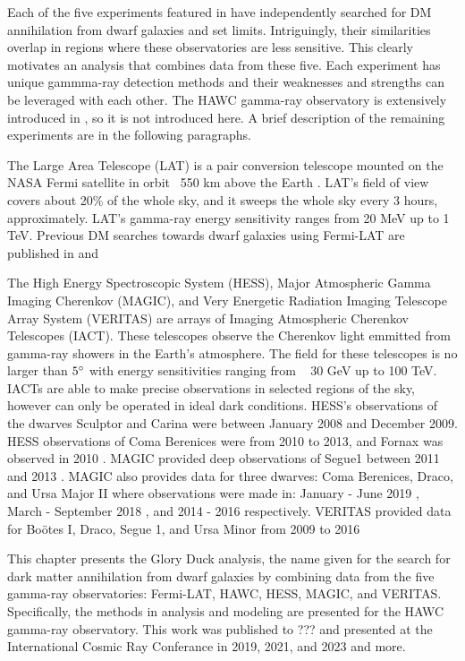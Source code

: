 Each of the five experiments featured in  have independently searched for DM annihilation from dwarf galaxies and set limits.
Intriguingly, their similarities overlap in regions where these observatories are less sensitive.
This clearly motivates an analysis that combines data from these five.
Each experiment has unique gammma-ray detection methods and their weaknesses and strengths can be leveraged with each other.
The HAWC gamma-ray observatory is extensively introduced in , so it is not introduced here.
A brief description of the remaining experiments are in the following paragraphs.

The Large Area Telescope (LAT) is a pair conversion telescope mounted on the NASA Fermi satellite in orbit ~550 km above the Earth \cite{FermiLAT}.
LAT's field of view covers about 20\% of the whole sky, and it sweeps the whole sky every 3 hours, approximately.
LAT's gamma-ray energy sensitivity ranges from 20 MeV up to 1 TeV.
Previous DM searches towards dwarf galaxies using Fermi-LAT are published in \cite{FermiLAT:dm1} and \cite{FermiLAT:dm2}

\sloppy The High Energy Spectroscopic System (HESS), Major Atmospheric Gamma Imaging
Cherenkov (MAGIC), and Very Energetic Radiation Imaging Telescope Array System (VERITAS) are arrays of Imaging Atmospheric Cherenkov Telescopes (IACT).
These telescopes observe the Cherenkov light emmitted from gamma-ray showers in the Earth's atmosphere.
The field for these telescopes is no larger than $5\degree$ with energy sensitivities ranging from ~ 30 GeV up to 100 TeV. \cite{HESS,MAGIC,VERITAS}
IACTs are able to make precise observations in selected regions of the sky, however can only be operated in ideal dark conditions.
HESS's  observations of the dwarves Sculptor and Carina were between January 2008 and December 2009.
HESS observations of Coma Berenices were from 2010 to 2013, and Fornax was observed in 2010 \cite{HESS:dm_sculptor_carina,HESS:dm_dwarves,HESS:dm_gamma_lines}.
MAGIC provided deep observations of Segue1 between 2011 and 2013 \cite{MAGIC:dm_segue1}.
MAGIC also provides data for three dwarves: Coma Berenices, Draco, and Ursa Major II where observations were made in: January - June 2019 \cite{MAGIC:dm_comab_draco}, March - September 2018 \cite{MAGIC:dm_comab_draco}, and 2014 - 2016 \cite{MAGIC:dm_uma2} respectively.
VERITAS provided data for Boötes I, Draco, Segue 1, and Ursa Minor from 2009 to 2016 \cite{VERITAS:dm_dwarves}

This chapter presents the Glory Duck analysis, the name given for the search for dark matter annihilation from dwarf galaxies by combining data from the five gamma-ray observatories: Fermi-LAT, HAWC, HESS, MAGIC, and VERITAS.
Specifically, the methods in analysis and modeling are presented for the HAWC gamma-ray observatory.
This work was published to ??? and presented at the International Cosmic Ray Conferance in 2019, 2021, and 2023 \cite{glory_duck:ICRC2019,glory_duck:ICRC2021,glory_duck:ICRC2023} and more.

